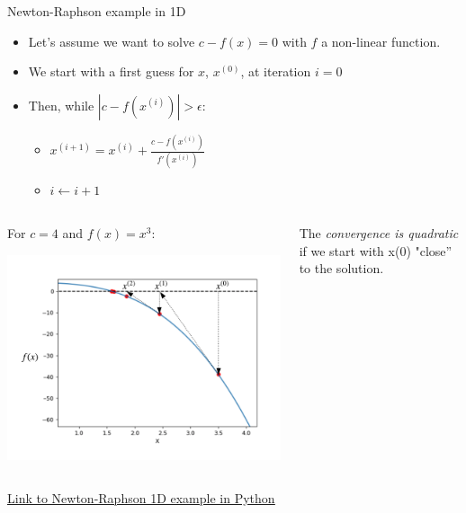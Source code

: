 \begin{frame}[allowframebreaks]{Newton-Raphson example in 1D}
    \begin{itemize}
        \item Let's assume we want to solve $c-f(x) = 0$ with $f$ a non-linear function.
        \item We start with a first guess for $x$, $x^{(0)}$, at iteration $i=0$
        \item Then, while $|c-f(x^{(i)})| > \epsilon$:
        \begin{itemize}
            \item $x^{(i+1)} = x^{(i)} + \frac{c-f(x^{(i)})}{f'(x^{(i)})}$
            \item $i \leftarrow i + 1$
        \end{itemize}
    \end{itemize}
    
    \begin{columns}
    \begin{column}{0.55\textwidth}
    For $c=4$ and $f(x) = x^3$:
    \begin{center}
        \includegraphics[width=0.8\linewidth]{images/NR-1D.png}
    \end{center}
    \end{column}
    \begin{column}{0.45\textwidth}
    The \textit{convergence is quadratic} if we start with x(0) "close” to the solution.
    \end{column}
    \end{columns}
    \href{https://colab.research.google.com/drive/12tCcO6kPxkoScAGnUYxgumS3CVSBSmtJ?usp=sharing}{\underline{Link to Newton-Raphson 1D example in Python}} 
\end{frame}

